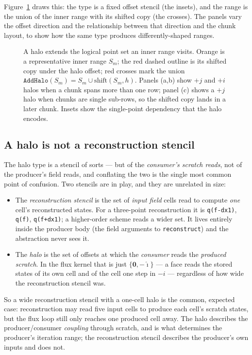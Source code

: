 \documentclass[11pt]{article}
\newcommand{\code}[1]{\lstinline[basicstyle=\ttfamily]|#1|}
\begin{document}
Figure~\ref{fig:halo} draws this: the type is a fixed offset stencil (the insets),
and the range is the union of the inner range with its shifted copy (the crosses).
The panels vary the offset direction and the relationship between that direction
and the chunk layout, to show how the same type produces differently-shaped ranges.

\begin{figure}[t]
\centering

\caption{A halo extends the logical point set an inner range visits. Orange is a
representative inner range $S_m$; the red dashed outline is its shifted copy under
the halo offset; red crosses mark the union
$\texttt{AddHalo}(S_m) = S_m \cup \text{shift}(S_m, h)$. Panels (a,b) show $+j$ and
$+i$ halos when a chunk spans more than one row; panel (c) shows a $+j$ halo when
chunks are single sub-rows, so the shifted copy lands in a later chunk. Insets show
the single-point dependency that the halo encodes.}
\label{fig:halo}
\end{figure}

\subsection{A halo is not a reconstruction stencil}
\label{sec:halo-not-stencil}

The halo type is a stencil of sorts --- but of the \emph{consumer's scratch
reads}, not of the producer's field reads, and conflating the two is the single
most common point of confusion. Two stencils are in play, and they are unrelated
in size:
\begin{itemize}
\item The \emph{reconstruction stencil} is the set of \emph{input field} cells read
  to compute \emph{one} cell's reconstructed states. For a three-point reconstruction
  it is \code{q(f-dx1)}, \code{q(f)}, \code{q(f+dx1)}; a higher-order scheme reads a
  wider set. It lives entirely inside the producer body (the field arguments to
  \code{reconstruct}) and the abstraction never sees it.
\item The \emph{halo} is the set of offsets at which the \emph{consumer} reads the
  \emph{produced scratch}. In the flux kernel that is just $\{\mathbf{0},
  -\hat{\imath}\}$ --- a face reads the stored states of its own cell and of the
  cell one step in $-i$ --- regardless of how wide the reconstruction stencil was.
\end{itemize}
So a wide reconstruction stencil with a one-cell halo is the common, expected case:
reconstruction may read five input cells to produce each cell's scratch states, but
the flux loop still only reaches one produced cell away. The halo describes the
producer/consumer \emph{coupling} through scratch, and is what determines the
producer's iteration range; the reconstruction stencil describes the producer's own
inputs and does not.
\end{document}
